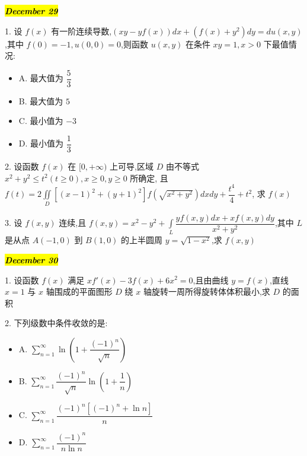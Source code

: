 \hl{\textbf{\textit{December 29}}}

1. 设 $f(x)$ 有一阶连续导数,$(xy-yf(x))dx+(f(x)+y^{2})dy=du(x,y)$,其中 $f(0)=-1,u(0,0)=0$,则函数 $u(x,y)$ 在条件 $xy=1,x>0$ 下最值情况:
\begin{itemize}
	\item A. 最大值为 $\dfrac{5}{3}$
	\item B. 最大值为 $5$
	\item C. 最小值为 $-3$
	\item D. 最小值为 $\dfrac{1}{3}$
\end{itemize}
\begin{solution}
	
\end{solution}

2. 设函数 $f(x)$ 在 $[0,+\infty)$ 上可导,区域 $D$ 由不等式 $x^{2}+y^{2}\leq t^{2}(t\geq 0),x\geq 0,y\geq 0$ 所确定,
且 $\displaystyle{f(t)=2\iint\limits_{D}[(x-1)^{2}+(y+1)^{2}]f(\sqrt{x^{2}+y^{2}})dxdy+\dfrac{t^{4}}{4}+t^{2}}$, 求 $f(x)$
\begin{solution}
	
\end{solution}

3. 设 $f(x,y)$ 连续,且 $\displaystyle{f(x,y)=x^{2}-y^{2}+\int\limits_{L}\dfrac{yf(x,y)dx+xf(x,y)dy}{x^{2}+y^{2}}}$,其中 $L$ 是从点 $A(-1,0)$ 到 $B(1,0)$ 的上半圆周 $y=\sqrt{1-x^{2}}$,求 $f(x,y)$
\begin{solution}
	
\end{solution}

\hl{\textbf{\textit{December 30}}}

1. 设函数 $f(x)$ 满足 $xf'(x)-3f(x)+6x^{2}=0$,且由曲线 $y=f(x)$,直线 $x=1$ 与 $x$ 轴围成的平面图形 $D$ 绕 $x$ 轴旋转一周所得旋转体体积最小,求 $D$ 的面积
\begin{solution}
	
\end{solution}

2. 下列级数中条件收敛的是:
\begin{itemize}
	\item A. $\sum\limits_{n=1}^{\infty}\ln(1+\dfrac{(-1)^{n}}{\sqrt{n}})$
	\item B. $\sum\limits_{n=1}^{\infty}\dfrac{(-1)^{n}}{\sqrt{n}}\ln(1+\dfrac{1}{n})$
	\item C. $\sum\limits_{n=1}^{\infty}\dfrac{(-1)^{n}[(-1)^{n}+\ln n]}{n}$
	\item D. $\sum\limits_{n=1}^{\infty}\dfrac{(-1)^{n}}{n\ln n}$
\end{itemize}
\begin{solution}
	
\end{solution}


